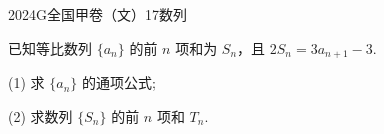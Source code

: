 
\begin{problem}{2024}{G}{全国甲卷（文）}{17}{数列}

已知等比数列 $\{a_n\}$ 的前 $n$ 项和为 $S_n$，且 $2S_n=3a_{n+1}-3$.

(1) 求 $\{a_n\}$ 的通项公式;

(2) 求数列 $\{S_n\}$ 的前 $n$ 项和 $T_n$.

\end{problem}

